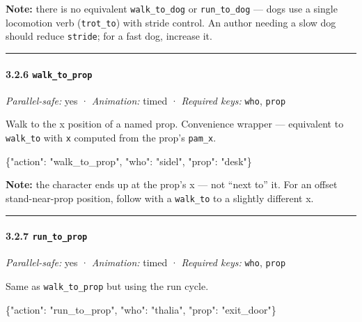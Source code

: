 \documentclass[
  11pt,
]{book}
\newenvironment{Shaded}{}{}
\newcommand{\DataTypeTok}[1]{\textcolor[rgb]{0.56,0.13,0.00}{#1}}
\newcommand{\FunctionTok}[1]{\textcolor[rgb]{0.02,0.16,0.49}{#1}}
\newcommand{\StringTok}[1]{\textcolor[rgb]{0.25,0.44,0.63}{#1}}
\begin{document}
\textbf{Note:} there is no equivalent \texttt{walk\_to\_dog} or
\texttt{run\_to\_dog} --- dogs use a single locomotion verb
(\texttt{trot\_to}) with stride control. An author needing a slow dog
should reduce \texttt{stride}; for a fast dog, increase it.

\begin{center}\rule{0.5\linewidth}{0.5pt}\end{center}

\paragraph{\texorpdfstring{3.2.6
\texttt{walk\_to\_prop}}{3.2.6 walk\_to\_prop}}\label{walk_to_prop}

\emph{Parallel-safe:} yes · \emph{Animation:} timed · \emph{Required
keys:} \texttt{who}, \texttt{prop}

Walk to the x position of a named prop. Convenience wrapper ---
equivalent to \texttt{walk\_to} with \texttt{x} computed from the prop's
\texttt{pam\_x}.

\begin{Shaded}
\begin{Highlighting}[]
\FunctionTok{\{}\DataTypeTok{"action"}\FunctionTok{:} \StringTok{"walk\_to\_prop"}\FunctionTok{,} \DataTypeTok{"who"}\FunctionTok{:} \StringTok{"sidel"}\FunctionTok{,} \DataTypeTok{"prop"}\FunctionTok{:} \StringTok{"desk"}\FunctionTok{\}}
\end{Highlighting}
\end{Shaded}

\textbf{Note:} the character ends up at the prop's x --- not ``next to''
it. For an offset stand-near-prop position, follow with a
\texttt{walk\_to} to a slightly different x.

\begin{center}\rule{0.5\linewidth}{0.5pt}\end{center}

\paragraph{\texorpdfstring{3.2.7
\texttt{run\_to\_prop}}{3.2.7 run\_to\_prop}}\label{run_to_prop}

\emph{Parallel-safe:} yes · \emph{Animation:} timed · \emph{Required
keys:} \texttt{who}, \texttt{prop}

Same as \texttt{walk\_to\_prop} but using the run cycle.

\begin{Shaded}
\begin{Highlighting}[]
\FunctionTok{\{}\DataTypeTok{"action"}\FunctionTok{:} \StringTok{"run\_to\_prop"}\FunctionTok{,} \DataTypeTok{"who"}\FunctionTok{:} \StringTok{"thalia"}\FunctionTok{,} \DataTypeTok{"prop"}\FunctionTok{:} \StringTok{"exit\_door"}\FunctionTok{\}}
\end{Highlighting}
\end{Shaded}
\end{document}
